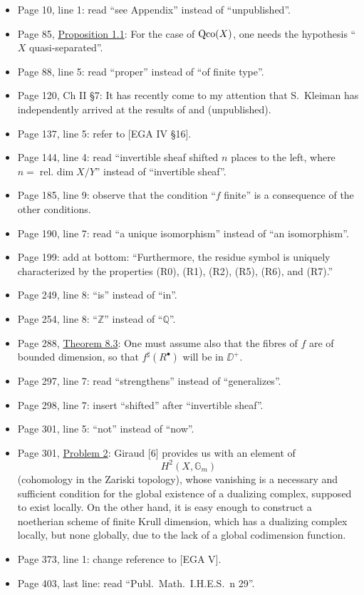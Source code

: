\begin{itemize}
\item Page 10, line 1: read ``see Appendix'' instead of ``unpublished''.
\item Page 85, \hyperref[prop:2.1.1]{Proposition 1.1}: For the case of $\operatorname{Qco}(X)$, one needs the hypothesis ``$X$ quasi-separated''.
\item Page 88, line 5: read ``proper'' instead of ``of finite type''.
\item Page 120, Ch II \S7: It has recently come to my attention that S.\ Kleiman has independently arrived at the results of  and  (unpublished).
\item Page 137, line 5: refer to [EGA IV \S16].
\item Page 144, line 4: read ``invertible sheaf shifted $n$ places to the left, where $n = \operatorname{rel.\ dim} X/Y$'' instead of ``invertible sheaf''.
\item Page 185, line 9: observe that the condition ``$f$ finite'' is a consequence of the other conditions.
\item Page 190, line 7: read ``a unique isomorphism'' instead of ``an isomorphism''.
\item Page 199: add at bottom: ``Furthermore, the residue symbol is uniquely characterized by the properties (R0), (R1), (R2), (R5), (R6), and (R7).''
\item Page 249, line 8: ``is'' instead of ``in''.
\item Page 254, line 8: ``$\mathbb{Z}$'' instead of ``$\mathbb{Q}$''.
\item Page 288, \hyperref[thm:5.8.3]{Theorem 8.3}: One must assume also that the fibres of $f$ are of bounded dimension, so that $f^{\sharp}(R^{\bullet})$ will be in $\DD^{+}$.
\item Page 297, line 7: read ``strengthens'' instead of ``generalizes''.
\item Page 298, line 7: insert ``shifted'' after ``invertible sheaf''.
\item Page 301, line 5: ``not'' instead of ``now''.
\item Page 301, \hyperref[prob:5.10.2]{Problem 2}: Giraud [6] provides us with an element of
\[
H^{2}(X, \mathbb{G}_{m})
\]
(cohomology in the Zariski topology), whose vanishing is a necessary and sufficient condition for the global existence of a dualizing complex, supposed to exist locally. On the other hand, it is easy enough to construct a noetherian scheme of finite Krull dimension, which has a dualizing complex locally, but none globally, due to the lack of a global codimension function.
\item Page 373, line 1: change reference to [EGA V].
\item Page 403, last line: read ``Publ.\ Math.\ I.H.E.S.\ n\textdegree{} 29''.
\end{itemize}
